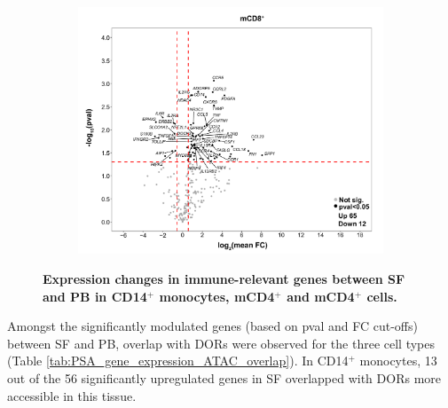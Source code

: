 \begin{figure}[htbp]
\begin{subfigure}{0.5\textwidth}
\caption{\textbf{}}
\end{subfigure} %
\begin{subfigure}{0.5\textwidth}
\centering
\includegraphics[width=\textwidth]{./Results3/pdfs/PSA_CD8_vulcano_plot_PCR_array_mean_FC}
\caption{\textbf{}}
\end{subfigure}
\caption[Expression changes in immune-relevant genes between SF and PB in CD14$^+$ monocytes, mCD4$^+$ and mCD4$^+$ cells.]{\textbf{Expression changes in immune-relevant genes between SF and PB in CD14$^+$ monocytes, mCD4$^+$ and mCD4$^+$ cells.}}
\label{fig:PSA_PCR_array_vulcano_plots}
\end{figure} 



Amongst the significantly modulated genes (based on pval and FC cut-offs) between SF and PB, overlap with DORs were observed for the three cell types (Table \ref{tab:PSA_gene_expression_ATAC_overlap}). In CD14$^+$ monocytes, 13 out of the 56 significantly upregulated genes in SF overlapped with DORs more accessible in this tissue. 


